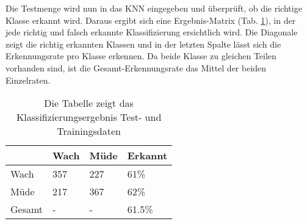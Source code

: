Die Testmenge wird nun in das KNN eingegeben und überprüft, ob die richtige Klasse erkannt wird. Daraus ergibt sich eine Ergebnis-Matrix (Tab. \ref{tab:ann_results}), in der jede richtig und falsch erkannte Klassifizierung ersichtlich wird. Die Diagonale zeigt die richtig erkannten Klassen und in der letzten Spalte lässt sich die Erkennungsrate pro Klasse erkennen. Da beide Klasse zu gleichen Teilen vorhanden sind, ist die  Gesamt-Erkennungsrate das Mittel der beiden Einzelraten.

\begin{table}[t]
 \centering
 \caption[KNN Ergebnis-Matrix]{Die Tabelle zeigt das Klassifizierungsergebnis Test- und Trainingsdaten \label{tab:ann_results}}
 \begin{tabular}{l|lll}
   & Wach & Müde & Erkannt \\ \hline
  Wach & 357 & 227 & 61\%\\  
  Müde & 217 & 367 & 62\%\\ 
  Gesamt & - & - & 61.5\%\\ 
 \end{tabular}
\end{table}